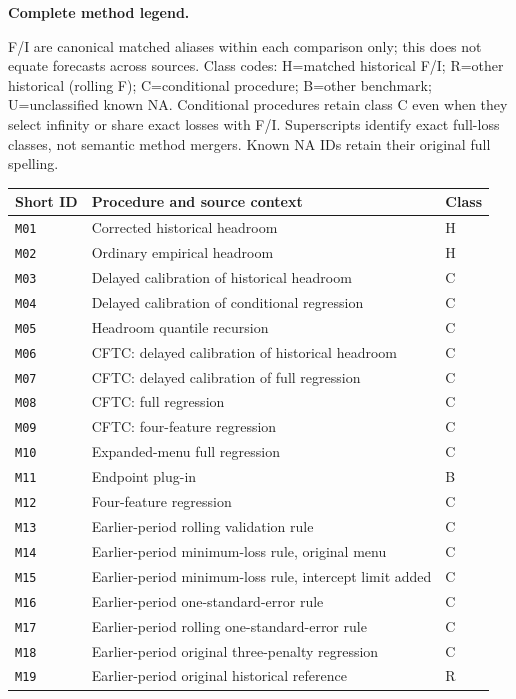 \documentclass[10pt,a4paper]{article}
\begin{document}
\clearpage
\noindent\textbf{Complete method legend.}\par
F/I are canonical matched aliases within each comparison only; this does not equate forecasts across sources. Class codes: H=matched historical F/I; R=other historical (rolling F); C=conditional procedure; B=other benchmark; U=unclassified known NA. Conditional procedures retain class C even when they select infinity or share exact losses with F/I. Superscripts identify exact full-loss classes, not semantic method mergers. Known NA IDs retain their original full spelling.
\begin{longtable}{@{}lp{118mm}l@{}}
\toprule
Short ID & Procedure and source context & Class \\
\midrule
\endhead
\texttt{M01} & Corrected historical headroom & H \\
\texttt{M02} & Ordinary empirical headroom & H \\
\texttt{M03} & Delayed calibration of historical headroom & C \\
\texttt{M04} & Delayed calibration of conditional regression & C \\
\texttt{M05} & Headroom quantile recursion & C \\
\texttt{M06} & CFTC: delayed calibration of historical headroom & C \\
\texttt{M07} & CFTC: delayed calibration of full regression & C \\
\texttt{M08} & CFTC: full regression & C \\
\texttt{M09} & CFTC: four-feature regression & C \\
\texttt{M10} & Expanded-menu full regression & C \\
\texttt{M11} & Endpoint plug-in & B \\
\texttt{M12} & Four-feature regression & C \\
\texttt{M13} & Earlier-period rolling validation rule & C \\
\texttt{M14} & Earlier-period minimum-loss rule, original menu & C \\
\texttt{M15} & Earlier-period minimum-loss rule, intercept limit added & C \\
\texttt{M16} & Earlier-period one-standard-error rule & C \\
\texttt{M17} & Earlier-period rolling one-standard-error rule & C \\
\texttt{M18} & Earlier-period original three-penalty regression & C \\
\texttt{M19} & Earlier-period original historical reference & R \\

\end{longtable}
\end{document}
